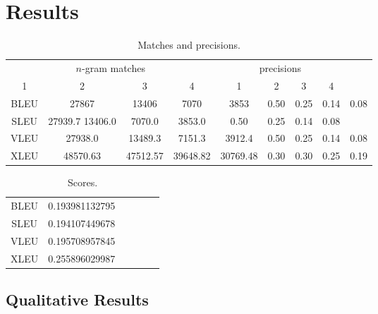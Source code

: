 
\section{Results}
\label{sec:results}

\begin{table}[h]
  \centering
  \begin{tabular}{|c|c|c|c|c|c|c|c|c|}
\hline
\multicolumn{4}{c}{$n$-gram matches} & \multicolumn{4}{c}{precisions} \\
1 & 2 & 3 & 4 & 1 & 2 & 3 & 4 \\
BLEU & 27867 & 13406 & 7070 & 3853 & 0.50 & 0.25 & 0.14 & 0.08 \\
SLEU & 27939.7 13406.0 & 7070.0 & 3853.0 & 0.50 & 0.25 & 0.14 & 0.08 \\
VLEU & 27938.0 & 13489.3 & 7151.3 & 3912.4 & 0.50 & 0.25 & 0.14 & 0.08 \\
XLEU & 48570.63 & 47512.57 & 39648.82 & 30769.48 & 0.30 & 0.30 & 0.25 & 0.19 \\
\hline
  \end{tabular}
  \caption{Matches and precisions.}
  \label{tab:matches}
\end{table}


\begin{table}[h]
  \centering
  \begin{tabular}{|c|c|c|c||c|c|}
\hline
BLEU & 0.193981132795 \\
SLEU & 0.194107449678 \\
VLEU & 0.195708957845 \\
XLEU & 0.255896029987 \\
\hline
  \end{tabular}
  \caption{Scores.}
  \label{tab:scores}
\end{table}

\subsection{Qualitative Results}
\label{sec:qual}



